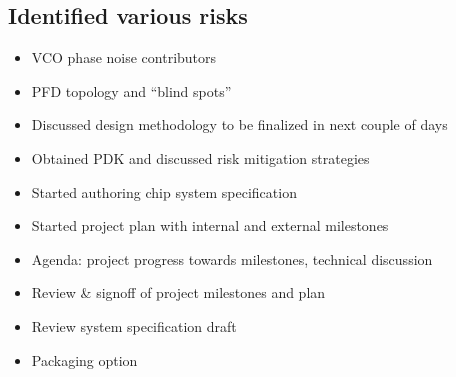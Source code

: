 \documentclass{article}
\begin{document}
\subsection*{Identified various risks} %

\begin{itemize}
	\item VCO phase noise contributors
	\item PFD topology and “blind spots” %
	\item Discussed design methodology to be finalized in next couple of days
	\item Obtained PDK and discussed risk mitigation strategies %
	\item Started authoring chip system specification
	\item Started project plan with internal and external milestones
	\item Agenda: project progress towards milestones, technical discussion
	\item Review \& signoff of project milestones and plan
	\item Review system specification draft 
	\item Packaging option
\end{itemize}







\newpage
\end{document}
